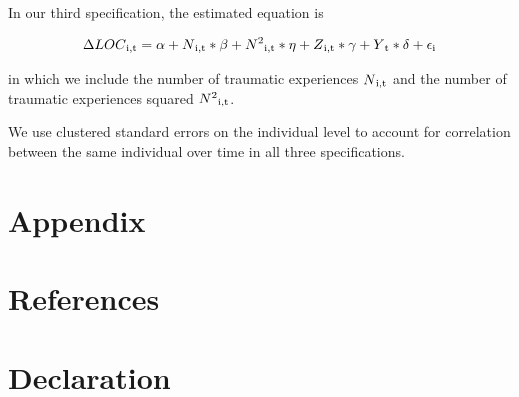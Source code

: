 \documentclass[12pt, a4paper, fleqn, parskip]{scrartcl}
\begin{document}
In our third specification, the estimated equation is

\begin{align}
	\Delta LOC \textsubscript{i,t}= \alpha + N \textsubscript{i,t} * \beta + N
	\textsuperscript{2}\textsubscript{i,t} * \eta + Z \textsubscript{i,t} *
	\gamma + Y\textsubscript{t} * \delta + \epsilon\textsubscript{i}
\end{align}

in which we include the number of traumatic experiences $N \textsubscript{i,t}$
and the number of traumatic experiences squared $N
\textsuperscript{2}\textsubscript{i,t}$.

We use clustered standard errors on the individual level to account for
correlation between the same individual over time in all three specifications.

\printbibliography

\appendix
\setcounter{secnumdepth}{0}
\section{Appendix}




\pagebreak
\setcounter{secnumdepth}{0}
\section{References}




\pagebreak
\setcounter{secnumdepth}{0}
\section{Declaration}
\end{document}
